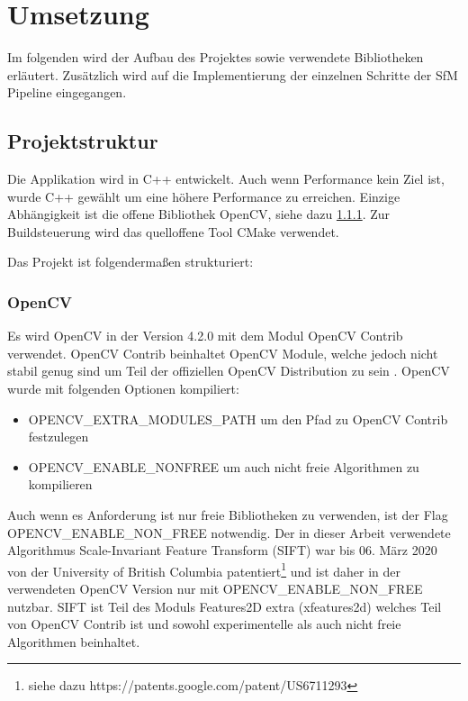 
\chapter{Umsetzung}
Im folgenden wird der Aufbau des Projektes sowie verwendete Bibliotheken erläutert.
Zusätzlich wird auf die Implementierung der einzelnen Schritte der SfM Pipeline eingegangen.

\section{Projektstruktur}
Die Applikation wird in C++ entwickelt.
Auch wenn Performance kein Ziel ist, wurde C++ gewählt um eine höhere Performance zu erreichen.
Einzige Abhängigkeit ist die offene Bibliothek OpenCV, siehe dazu \ref{sec:opencv}.
Zur Buildsteuerung wird das quelloffene Tool CMake verwendet.

Das Projekt ist folgendermaßen strukturiert:



\subsection{OpenCV}\label{sec:opencv}
Es wird OpenCV in der Version 4.2.0 mit dem Modul OpenCV Contrib verwendet.
OpenCV Contrib beinhaltet OpenCV Module, welche jedoch nicht stabil genug sind um Teil der offiziellen OpenCV Distribution zu sein \cite[README.md]{opencv_2013}.
OpenCV wurde mit folgenden Optionen kompiliert:
\begin{itemize}
	\item OPENCV\_EXTRA\_MODULES\_PATH um den Pfad zu OpenCV Contrib festzulegen
	\item OPENCV\_ENABLE\_NONFREE um auch nicht freie Algorithmen zu kompilieren
\end{itemize}
Auch wenn es Anforderung ist nur freie Bibliotheken zu verwenden, ist der Flag OPENCV\_ENABLE\_NON\_FREE notwendig.
Der in dieser Arbeit verwendete Algorithmus Scale-Invariant Feature Transform (SIFT) war bis 06. März 2020 von der University of British Columbia patentiert\footnote{siehe dazu https://patents.google.com/patent/US6711293} und ist daher in der verwendeten OpenCV Version nur mit OPENCV\_ENABLE\_NON\_FREE nutzbar.
SIFT ist Teil des Moduls Features2D extra (xfeatures2d) welches Teil von OpenCV Contrib ist und sowohl experimentelle als auch nicht freie Algorithmen beinhaltet.

